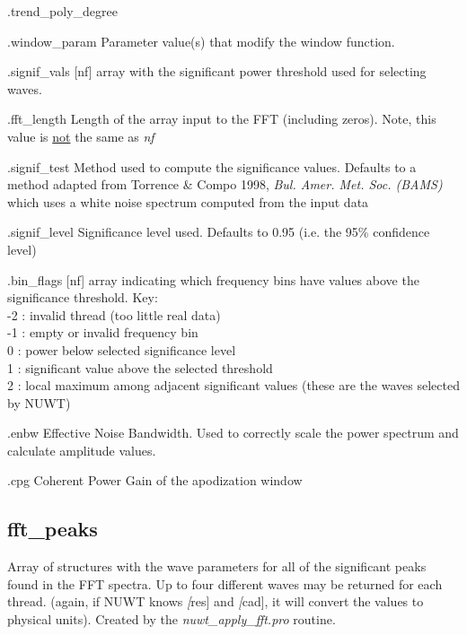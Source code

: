 \documentclass{article}
\begin{document}
\begin{labeling}{.trend\_poly\_degree}
\item[.window\_param] Parameter value(s) that modify the window function.
\item[.signif\_vals] [nf] array with the significant power threshold used for selecting waves.
\item[.fft\_length] Length of the array input to the FFT (including zeros). Note, this value is \underline{not} the same as \textit{nf}
\item[.signif\_test] Method used to compute the significance values. Defaults to a method adapted from Torrence \& Compo 1998, \textit{Bul. Amer. Met. Soc. (BAMS)} which uses a white noise spectrum computed from the input data
\item[.signif\_level] Significance level used. Defaults to 0.95 (i.e. the 95\% confidence level)
\item[.bin\_flags] [nf] array indicating which frequency bins have values above the significance threshold. Key: \\
-2 : invalid thread (too little real data) \\
-1 : empty or invalid frequency bin \\
0 : power below selected significance level \\
1 : significant value above the selected threshold \\
2 : local maximum among adjacent significant values (these are the waves selected by NUWT)
\item[.enbw] Effective Noise Bandwidth. Used to correctly scale the power spectrum and calculate amplitude values.
\item[.cpg] Coherent Power Gain of the apodization window
\end{labeling}



\subsection{fft\_peaks} 
Array of structures with the wave parameters for all of the significant peaks found in the FFT spectra. Up to four different waves may be returned for each thread. (again, if NUWT knows \textit[res] and \textit[cad], it will convert the values to physical units). Created by the \textit{nuwt\_apply\_fft.pro} routine.
\end{document}
